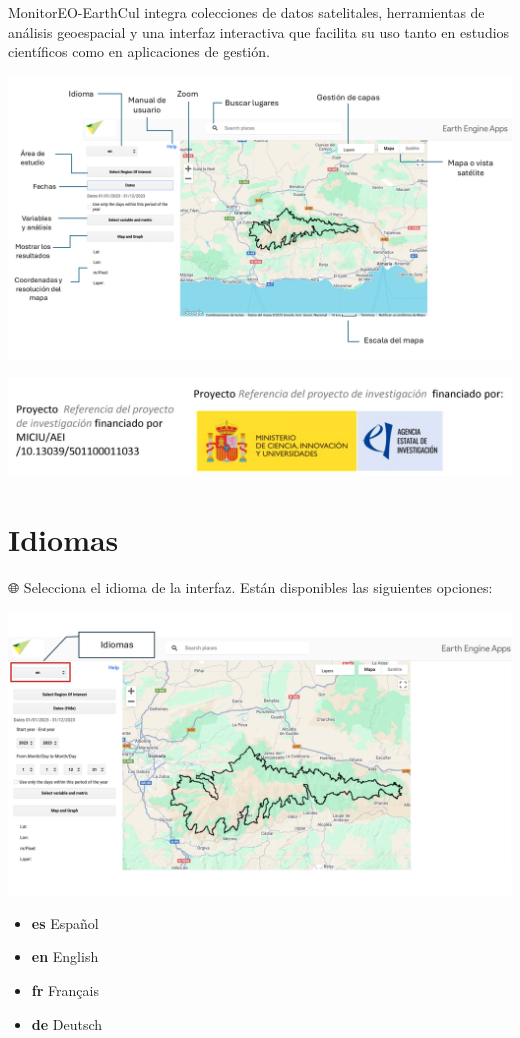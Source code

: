 \documentclass[
]{book}
\begin{document}
MonitorEO-EarthCul integra colecciones de datos satelitales, herramientas de análisis geoespacial y una interfaz interactiva que facilita su uso tanto en estudios científicos como en aplicaciones de gestión.

\includegraphics{assets/InterfazMonitorEO_es.png}

\includegraphics{assets/logo.jpeg}

\chapter{Idiomas}\label{idiomas}

🌐 Selecciona el idioma de la interfaz. Están disponibles las siguientes opciones:

\includegraphics{assets/Idiomas.png}

\begin{itemize}
\item
  \textbf{es}
  Español
\item
  \textbf{en}
  English
\item
  \textbf{fr}
  Français
\item
  \textbf{de}
  Deutsch
\end{itemize}
\end{document}
